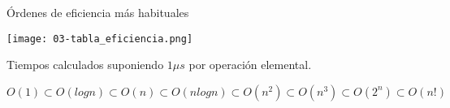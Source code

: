 \begin{frame}[c]{Órdenes de eficiencia más habituales}
  \begin{center}
    \texttt{[image: 03-tabla\_eficiencia.png]}
  \end{center}
  Tiempos calculados suponiendo $1 \mu{}s$ por operación elemental.

  \begin{math}
    O(1) \subset O(log n) \subset O(n) \subset O(n log n) \subset
    O(n^2) \subset O(n^3) \subset O(2^n) \subset O(n!)
  \end{math}
\end{frame}

%
%
%


